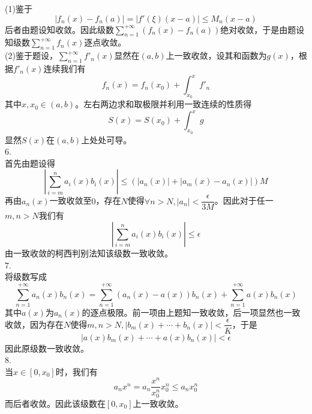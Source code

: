 \documentclass[utf8]{ctexart}
\begin{document}
(1)鉴于
\[|f_n(x)-f_n(a)|=|f'(\xi)(x-a)|\le M_n(x-a)\]
后者由题设知收敛。因此级数$\sum\limits_{n=1}^{+\infty}(f_n(x)-f_n(a))$绝对收敛，于是由题设知级数$\sum\limits_{n=1}^{+\infty}f_n(x)$逐点收敛。\\
(2)鉴于题设，$\sum\limits_{n=1}^{+\infty}f'_n(x)$显然在$(a,b)$上一致收敛，设其和函数为$g(x)$，根据$f'_n(x)$连续我们有
\[f_n(x)=f_n(x_0)+\int_{x_0}^{x}f'_n\]
其中$x,x_0\in(a,b)$。左右两边求和取极限并利用一致连续的性质得
\[S(x)=S(x_0)+\int_{x_0}^{x}g\]
显然$S(x)$在$(a,b)$上处处可导。\\
6.\\
首先由题设得
\[|\sum_{i=m}^{n}a_i(x)b_i(x)|\le(|a_n(x)|+|a_m(x)-a_n(x)|)M\]
再由$a_n(x)$一致收敛至$0$，存在$N$使得$\forall n>N,|a_n|<\dfrac{\epsilon}{3M}$。因此对于任一$m,n>N$我们有
\[|\sum_{i=m}^{n}a_i(x)b_i(x)|\le\epsilon\]
由一致收敛的柯西判别法知该级数一致收敛。\\
7.\\
将级数写成
\[\sum_{n=1}^{+\infty}a_n(x)b_n(x)=\sum_{n=1}^{+\infty}(a_n(x)-a(x))b_n(x)+\sum_{n=1}^{+\infty}a(x)b_n(x)\]
其中$a(x)$为$a_n(x)$的逐点极限。前一项由上题知一致收敛，后一项显然也一致收敛，因为存在$N$使得$m,n>N,|b_m(x)+\cdots+b_n(x)|<\dfrac{\epsilon}{K}$，于是
\[|a(x)b_m(x)+\cdots+a(x)b_n(x)|<\epsilon\]
因此原级数一致收敛。\\
8.\\
当$x\in[0,x_0]$时，我们有
\[a_nx^n=a_n\frac{x^n}{x_0^n}x_0^n\le a_nx_0^n\]
而后者收敛。因此该级数在$[0,x_0]$上一致收敛。
\end{document}
